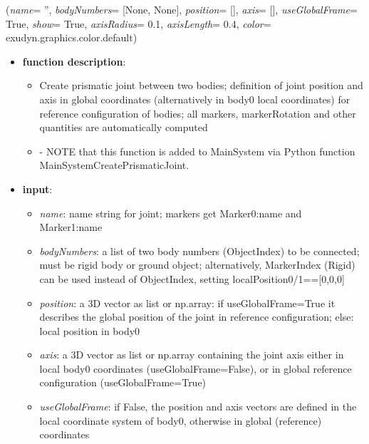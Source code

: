 %
\begin{flushleft}
\label{sec:mainsystemextensions:CreatePrismaticJoint}
({\it name}= '', {\it bodyNumbers}= [None, None], {\it position}= [], {\it axis}= [], {\it useGlobalFrame}= True, {\it show}= True, {\it axisRadius}= 0.1, {\it axisLength}= 0.4, {\it color}= exudyn.graphics.color.default)
\end{flushleft}
\setlength{\itemindent}{0.7cm}
\begin{itemize}[leftmargin=0.7cm]
\item[--]
{\bf function description}: \vspace{-6pt}
\begin{itemize}[leftmargin=1.2cm]
\setlength{\itemindent}{-0.7cm}
\item[]Create prismatic joint between two bodies; definition of joint position and axis in global coordinates (alternatively in body0 local coordinates) for reference configuration of bodies; all markers, markerRotation and other quantities are automatically computed
\item[]- NOTE that this function is added to MainSystem via Python function MainSystemCreatePrismaticJoint.
\end{itemize}
\item[--]
{\bf input}: \vspace{-6pt}
\begin{itemize}[leftmargin=1.2cm]
\setlength{\itemindent}{-0.7cm}
\item[]{\it name}: name string for joint; markers get Marker0:name and Marker1:name
\item[]{\it bodyNumbers}: a list of two body numbers (ObjectIndex) to be connected; must be rigid body or ground object; alternatively, MarkerIndex (Rigid) can be used instead of ObjectIndex, setting localPosition0/1==[0,0,0]
\item[]{\it position}: a 3D vector as list or np.array: if useGlobalFrame=True it describes the global position of the joint in reference configuration; else: local position in body0
\item[]{\it axis}: a 3D vector as list or np.array containing the joint axis either in local body0 coordinates (useGlobalFrame=False), or in global reference configuration (useGlobalFrame=True)
\item[]{\it useGlobalFrame}: if False, the position and axis vectors are defined in the local coordinate system of body0, otherwise in global (reference) coordinates

\end{itemize}
\end{itemize}
